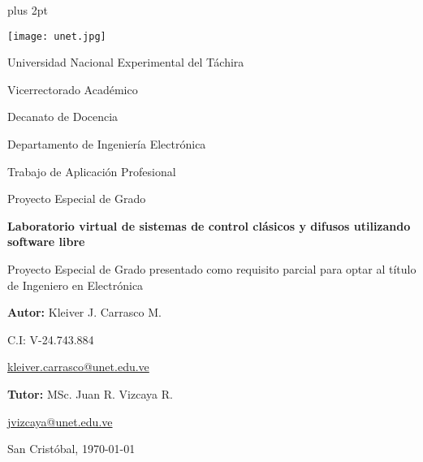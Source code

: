 \begin{titlepage}
	\parskip=7.25pt plus 2pt
	\setcounter{page}{2}
	\begin{center}
		\texttt{[image: unet.jpg]}
		
		Universidad Nacional Experimental del Táchira 
		
		Vicerrectorado Académico
		
		Decanato de Docencia
		
		Departamento de Ingeniería Electrónica
		
		Trabajo de Aplicación Profesional
		
		Proyecto Especial de Grado
	\end{center}

	\centering
	\vspace{2cm}
	\vfill
	{\Large \textbf{Laboratorio virtual de sistemas de control clásicos y difusos utilizando software libre}\par}
	\vspace{10pt}
	{\large Proyecto Especial de Grado presentado como requisito parcial para optar al título de Ingeniero en Electrónica}

	\vfill
	\begin{flushright}
		\begin{spacing}{1.5}
			\textbf{Autor:} Kleiver J. Carrasco M.
			
			C.I: V-24.743.884
			
			\href{kleiver.carrasco@unet.edu.ve}{kleiver.carrasco@unet.edu.ve}
			
			\textbf{Tutor:} MSc. Juan R. Vizcaya R.
			
			\href{jvizcaya@unet.edu.ve}{jvizcaya@unet.edu.ve}
		\end{spacing}	
	\end{flushright}

	\vfill
		San Cristóbal, \monthyeardate\today
	\leavevmode
\end{titlepage}